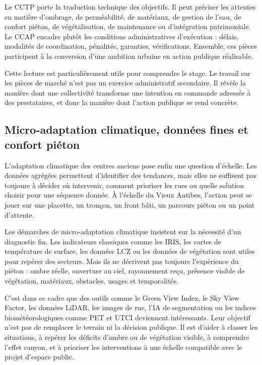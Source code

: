 \documentclass[11pt,a4paper]{report}
\begin{document}
Le CCTP porte la traduction technique des objectifs. Il peut préciser les attentes en matière d'ombrage, de perméabilité, de matériaux, de gestion de l'eau, de confort piéton, de végétalisation, de maintenance ou d'intégration patrimoniale. Le CCAP encadre plutôt les conditions administratives d'exécution : délais, modalités de coordination, pénalités, garanties, vérifications. Ensemble, ces pièces participent à la conversion d'une ambition urbaine en action publique réalisable.

Cette lecture est particulièrement utile pour comprendre le stage. Le travail sur les pièces de marché n'est pas un exercice administratif secondaire. Il révèle la manière dont une collectivité transforme une intention en commande adressée à des prestataires, et donc la manière dont l'action publique se rend concrète.

\subsection{Micro-adaptation climatique, données fines et confort piéton}

L'adaptation climatique des centres anciens pose enfin une question d'échelle. Les données agrégées permettent d'identifier des tendances, mais elles ne suffisent pas toujours à décider où intervenir, comment prioriser les rues ou quelle solution choisir pour une séquence donnée. À l'échelle du Vieux Antibes, l'action peut se jouer sur une placette, un tronçon, un front bâti, un parcours piéton ou un point d'attente.

Les démarches de micro-adaptation climatique insistent sur la nécessité d'un diagnostic fin. Les indicateurs classiques comme les IRIS, les cartes de température de surface, les données LCZ ou les données de végétation sont utiles pour repérer des secteurs. Mais ils ne décrivent pas toujours l'expérience du piéton : ombre réelle, ouverture au ciel, rayonnement reçu, présence visible de végétation, matériaux, obstacles, usages et temporalités.

C'est dans ce cadre que des outils comme le Green View Index, le Sky View Factor, les données LiDAR, les images de rue, l'IA de segmentation ou les indices biométéorologiques comme PET et UTCI deviennent intéressants. Leur objectif n'est pas de remplacer le terrain ni la décision publique. Il est d'aider à classer les situations, à repérer les déficits d'ombre ou de végétation visible, à comprendre l'effet canyon, et à prioriser les interventions à une échelle compatible avec le projet d'espace public.
\end{document}
